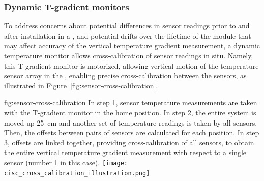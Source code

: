 \subsubsection{Dynamic T-gradient monitors}
\label{sec:fdgen-slow-cryo-dynamic-therm}

 To address concerns about potential differences in sensor readings prior to and after installation in a , and potential drifts over the lifetime of the %
 module that may affect accuracy of the vertical temperature gradient measurement, %
 a dynamic temperature monitor allows cross-calibration of sensor readings %
 in situ.
Namely, this T-gradient monitor is motorized, allowing vertical motion of the temperature sensor array %
in the , %
enabling precise cross-calibration between the sensors, %
as illustrated in Figure~\ref{fig:sensor-cross-calibration}.  

\begin{dunefigure}{fig:sensor-cross-calibration}
  {In step 1, sensor temperature measurements are taken with the T-gradient monitor in the home position. In step 2, the entire system is moved up \SI{25}{cm} and another set of temperature readings is taken by all sensors. Then, the offsets between pairs of sensors are calculated for each position. In step 3, offsets are linked together, providing cross-calibration of all sensors, to obtain the entire vertical temperature gradient measurement with respect to a single sensor (number 1 in this case). }
  \texttt{[image: cisc\_cross\_calibration\_illustration.png]}%
\end{dunefigure}


